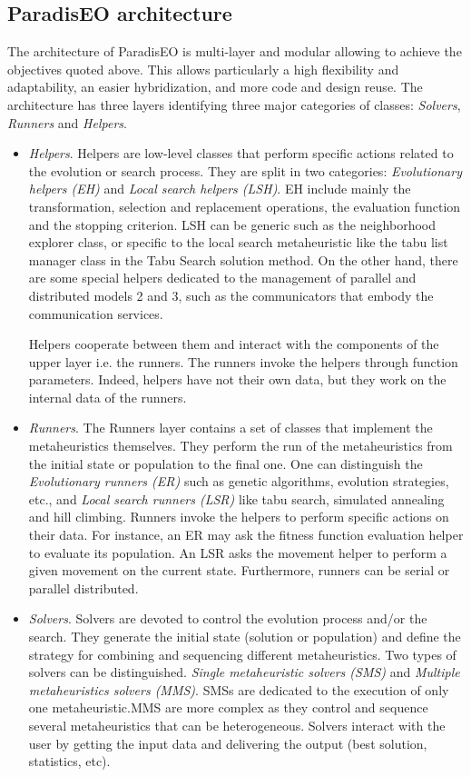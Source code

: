 \subsection{Paradis\-EO architecture}\label{main_architecture}
The architecture of Paradis\-EO is multi-layer and modular allowing to achieve the objectives quoted above. This allows particularly a high flexibility and adaptability, an easier hybridization, and more code and design reuse. The architecture has three layers identifying three major categories of classes: {\em Solvers\/}, {\em Runners\/} and {\em Helpers\/}. \begin{itemize}
\item {\em Helpers\/}. Helpers are low-level classes that perform specific actions related to the evolution or search process. They are split in two categories: {\em Evolutionary helpers (EH)\/} and {\em Local search helpers (LSH)\/}. EH include mainly the transformation, selection and replacement operations, the evaluation function and the stopping criterion. LSH can be generic such as the neighborhood explorer class, or specific to the local search metaheuristic like the tabu list manager class in the Tabu Search solution method. On the other hand, there are some special helpers dedicated to the management of parallel and distributed models 2 and 3, such as the communicators that embody the communication services.

Helpers cooperate between them and interact with the components of the upper layer i.e. the runners. The runners invoke the helpers through function parameters. Indeed, helpers have not their own data, but they work on the internal data of the runners.

\item {\em Runners\/}. The Runners layer contains a set of classes that implement the metaheuristics themselves. They perform the run of the metaheuristics from the initial state or population to the final one. One can distinguish the {\em Evolutionary runners (ER)\/} such as genetic algorithms, evolution strategies, etc., and {\em Local search runners (LSR)\/} like tabu search, simulated annealing and hill climbing. Runners invoke the helpers to perform specific actions on their data. For instance, an ER may ask the fitness function evaluation helper to evaluate its population. An LSR asks the movement helper to perform a given movement on the current state. Furthermore, runners can be serial or parallel distributed.

\item {\em Solvers\/}. Solvers are devoted to control the evolution process and/or the search. They generate the initial state (solution or population) and define the strategy for combining and sequencing different metaheuristics. Two types of solvers can be distinguished. {\em Single metaheuristic solvers (SMS)\/} and {\em Multiple metaheuristics solvers (MMS)\/}. SMSs are dedicated to the execution of only one metaheuristic.MMS are more complex as they control and sequence several metaheuristics that can be heterogeneous. Solvers interact with the user by getting the input data and delivering the output (best solution, statistics, etc). \end{itemize}


